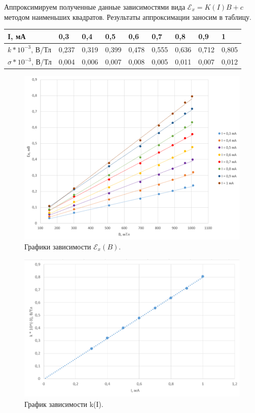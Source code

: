 \documentclass[a4paper,12pt]{article}
\begin{document}
Аппроксимируем полученные данные зависимостями вида $  \mathcal{E}_x=K(I)B+c $ методом наименьших квадратов. Результаты аппроксимации заносим в таблицу.

\begin{table}[!ht]
\centering
\begin{tabular}{|l|l|l|l|l|l|l|l|l|}
\hline
I, мА    & 0,3                          & 0,4   & 0,5   & 0,6   & 0,7   & 0,8   & 0,9   & 1     \\ \hline
$k * 10^{-3}$, В/Тл & {\color[HTML]{333333} 0,237} & 0,319 & 0,399 & 0,478 & 0,555 & 0,636 & 0,712 & 0,805 \\ \hline
$\sigma* 10^{-3}$, В/Тл   & 0,004                        & 0,006 & 0,007 & 0,008 & 0,005 & 0,011 & 0,007 & 0,012 \\ \hline
\end{tabular}
\end{table}

\newpage

\begin{figure}[h]
\centering
    \includegraphics[scale=0.4]{2.png}
    \centering
    \caption*{Графики зависимости $\mathcal{E}_x (B)$.}
\end{figure}

\begin{figure}[h]
\centering
    \includegraphics[scale=0.35]{3.png}
    \centering
    \caption*{График зависимости k(I).}
\end{figure}
\end{document}
